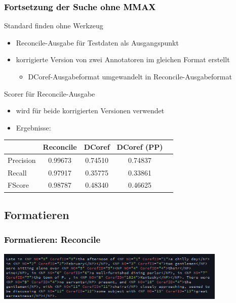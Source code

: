 \documentclass[xcolor=dvipsnames]{beamer}
\begin{document}

\begin{frame}\frametitle{\textcolor{black}{Fortsetzung der Suche ohne MMAX}}

\begin{block}{Standard finden ohne Werkzeug}
\begin{itemize}
\item Reconcile-Ausgabe für Testdaten als Ausgangspunkt
\item korrigierte Version von zwei Annotatoren im gleichen Format erstellt
\begin{itemize}
\item DCoref-Ausgabeformat umgewandelt in Reconcile-Ausgabeformat
\end{itemize}
\end{itemize}
\end{block}

\begin{block}{Scorer für Reconcile-Ausgabe}
\begin{itemize}
\item wird für beide korrigierten Versionen verwendet
\item Ergebnisse:
\end{itemize}
\begin{center}
  \begin{tabular}{ l || c | c | c ||  r }
				& Reconcile 	& DCoref 	& DCoref (PP) 	& \\ \hline \hline
    	Precision 	& 0.99673 	& 0.74510	& 0.74837		& \\ \hline
    	Recall     	& 0.97917 	& 0.35775 	& 0.33861 		& \\ \hline
    	FScore    	& 0.98787  	& 0.48340 	& 0.46625 		& \\ \hline
  \end{tabular}
\end{center}
\end{block}

\end{frame}



\subsection{Formatieren}


\begin{frame}\frametitle{\textcolor{black}{Formatieren: Reconcile}}

  \begin{center}
    \includegraphics[width=11cm]{img/reconcile-output.png}
  \end{center}
  
\end{frame}
\end{document}
